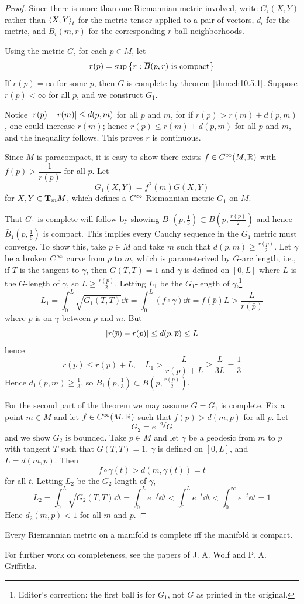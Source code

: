 \documentclass[../main]{subfiles}
\begin{document}
\begin{proof}
Since there is more than one Riemannian metric involved, write $G_i(X,Y)$ rather than $\ip XY_i$ for the metric tensor applied to a pair of vectors, $d_i$ for the metric, and $B_i(m,r)$ for the corresponding $r$-ball neighborhoods.

Using the metric $G$, for each $p\in M$, let
\[r(p) = \sup\brc{r: \bar B(p,r) \text{ is compact}}\]
If $r(p)=\infty$ for some $p$, then $G$ is complete by theorem \ref{thm:ch10.5.1}. Suppose $r(p)<\infty$ for all $p$, and we construct $G_1$.

Notice $\norm{r(p)-r(m)}\le d(p,m)$ for all $p$ and $m$, for if $r(p)>r(m)+d(p,m)$, one could increase $r(m)$; hence $r(p)\le r(m)+d(p,m)$ for all $p$ and $m$, and the inequality follows. This proves $r$ is continuous.

Since $M$ is paracompact, it is easy to show there exists $f\in\CInfty(M,\bR)$ with $f(p)>\dfrac{1}{r(p)}$ for all $p$. Let 
\[G_1(X,Y) = f^2(m)G(X,Y)\]
for $X,Y\in\ts Mm$, which defines a $\CInfty$ Riemannian metric $G_1$ on $M$.

That $G_1$ is complete will follow by showing $B_1(p,\tfrac13)\subset B(p,\tfrac{r(p)}{2})$ and hence $\bar B_1(p,\tfrac16)$ is compact. This implies every Cauchy sequence in the $G_1$ metric must converge. To show this, take $p\in M$ and take $m$ such that $d(p,m)\ge\frac{r(p)}{2}$. Let $\gamma$ be a broken $\CInfty$ curve from $p$ to $m$, which is parameterized by $G$-arc length, i.e., if $T$ is the tangent to $\gamma$, then $G(T,T)=1$ and $\gamma$ is defined on $[0,L]$ where $L$ is the $G$-length of $\gamma$, so $L\ge\frac{r(p)}{2}$. Letting $L_1$ be the $G_1$-length of $\gamma$,\footnote{Editor's correction: the first ball is for $G_1$, not $G$ as printed in the original.}
\[L_1 = \int_0^L\sqrt{G_1(T,T)}\dd t
= \int_0^L(f\circ\gamma)\dd t
= f(\bar p)L
> \frac{L}{r(\bar p)}\]
where $\bar p$ is on $\gamma$ between $p$ and $m$. But
\[\norm{r(\bar p)-r(p)}\le d(p,\bar p)\le L\]
hence
\[r(\bar p)\le r(p)+L,
\quad L_1>\frac{L}{r(p)+L}\ge\frac{L}{3L}=\frac13\]
Hence $d_1(p,m)\ge\frac13$, so $B_1(p,\tfrac13)\subset B(p,\tfrac{r(p)}{2})$.

For the second part of the theorem we may assume $G=G_1$ is complete. Fix a point $m\in M$ and let $f\in\CInfty(M,\bR)$ such that $f(p)>d(m,p)$ for all $p$. Let
\[G_2=e^{-2f}G\]
and we show $G_2$ is bounded. Take $p\in M$ and let $\gamma$ be a geodesic from $m$ to $p$ with tangent $T$ such that $G(T,T)=1$, $\gamma$ is defined on $[0,L]$, and $L=d(m,p)$. Then
\[f\circ\gamma(t)>d(m,\gamma(t))=t\]
for all $t$. Letting $L_2$ be the $G_2$-length of $\gamma$,
\[L_2 = \int_0^L\sqrt{G_2(T,T)}\dd t 
= \int_0^Le^{-f}\dd t
< \int_0^Le^{-t}\dd t
<\int_0^\infty e^{-t}\dd t
= 1\]
Hene $d_2(m,p)<1$ for all $m$ and $p$.
\end{proof}



\begin{corollary} \label{cor:ch10.5.4}
Every Riemannian metric on a manifold is complete iff the manifold is compact.
\end{corollary}



For further work on completeness, see the papers of J. A. Wolf and P. A. Griffiths.
\end{document}
